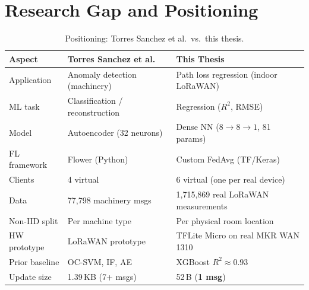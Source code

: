 \section{Research Gap and Positioning}
\label{sec:research-gap}

\begin{table}[H]
  \centering
  \begin{tabular}{p{3.5cm} p{4cm} p{4cm}}
    \toprule
    \textbf{Aspect} & \textbf{Torres Sanchez et al.} & \textbf{This Thesis} \\
    \midrule
    Application       & Anomaly detection (machinery) & Path loss regression (indoor LoRaWAN) \\[3pt]
    ML task           & Classification / reconstruction & Regression ($R^2$, RMSE) \\[3pt]
    Model             & Autoencoder (32 neurons) & Dense NN ($8\to8\to1$, 81 params) \\[3pt]
    FL framework      & Flower (Python) & Custom FedAvg (TF/Keras) \\[3pt]
    Clients           & 4 virtual & 6 virtual (one per real device) \\[3pt]
    Data              & 77,798 machinery msgs & 1,715,869 real LoRaWAN measurements \\[3pt]
    Non-IID split     & Per machine type & Per physical room location \\[3pt]
    HW prototype      & LoRaWAN prototype & TFLite Micro on real MKR WAN 1310 \\[3pt]
    Prior baseline    & OC-SVM, IF, AE & XGBoost $R^2 \approx 0.93$ \\[3pt]
    Update size       & 1.39\,KB (7+ msgs) & 52\,B (\textbf{1 msg}) \\
    \bottomrule
  \end{tabular}
  \caption{Positioning: Torres Sanchez et al.\ vs.\ this thesis.}
  \label{tab:positioning}
\end{table}



